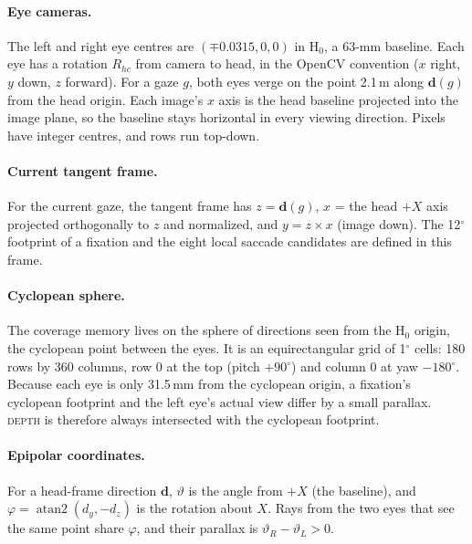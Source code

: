 \documentclass[11pt,a4paper]{article}
\newcommand{\Hz}{\ensuremath{\mathrm{H}_0}}
\newcommand{\degr}{\ensuremath{^\circ}}
\begin{document}
\paragraph{Eye cameras.} The left and right eye centres are $(\mp 0.0315, 0, 0)$ in \Hz{}, a 63-mm baseline. Each eye
has a rotation $R_{hc}$ from camera to head, in the OpenCV convention ($x$ right, $y$ down, $z$ forward). For a gaze
$g$, both eyes verge on the point 2.1\,m along $\mathbf{d}(g)$ from the head origin. Each image's $x$ axis is the head
baseline projected into the image plane, so the baseline stays horizontal in every viewing direction. Pixels have
integer centres, and rows run top-down.

\paragraph{Current tangent frame.} For the current gaze, the tangent frame has $z = \mathbf{d}(g)$, $x$ = the head $+X$
axis projected orthogonally to $z$ and normalized, and $y = z \times x$ (image down). The 12\degr{} footprint of a
fixation and the eight local saccade candidates are defined in this frame.

\paragraph{Cyclopean sphere.} The coverage memory lives on the sphere of directions seen from the \Hz{} origin, the
cyclopean point between the eyes. It is an equirectangular grid of 1\degr{} cells: 180 rows by 360 columns, row 0 at the
top (pitch $+90\degr$) and column 0 at yaw $-180\degr$. Because each eye is only 31.5\,mm from the cyclopean origin, a
fixation's cyclopean footprint and the left eye's actual view differ by a small parallax. \textsc{depth} is therefore
always intersected with the cyclopean footprint.

\paragraph{Epipolar coordinates.} For a head-frame direction $\mathbf{d}$, $\vartheta$ is the angle from $+X$ (the
baseline), and $\varphi = \operatorname{atan2}(d_y, -d_z)$ is the rotation about $X$. Rays from the two eyes that see
the same point share $\varphi$, and their parallax is $\vartheta_R - \vartheta_L > 0$.
\end{document}
